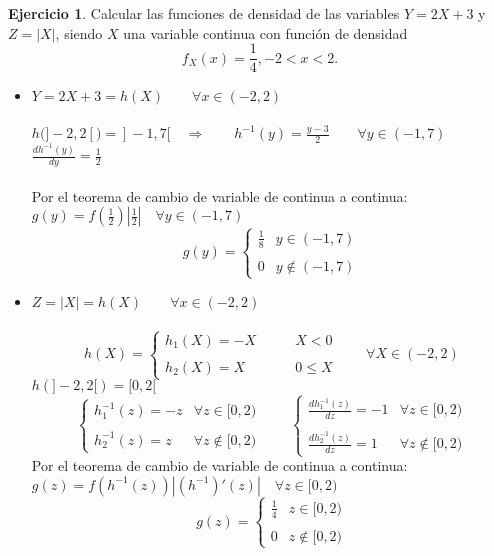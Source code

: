 \documentclass[a4paper, 12pt]{article}
\theoremstyle{definition}
\newtheorem{ej}{Ejercicio}
\begin{document}
\begin{ej}
		Calcular las funciones de densidad de las variables $Y = 2X +3$ y $Z = |X|$, siendo $X$ una
	variable continua con función de densidad
	\[f_X(x) = \frac{1}{4}, -2 < x < 2.\]
	\begin{itemize}
		\item \(Y = 2X+3 = h(X) \qquad\forall x\in (-2, 2)\) \\
		\\
		\(h(]-2,2[) = ]-1,7[\quad \Longrightarrow \qquad h^{-1}(y) = \frac{y-3}{2}\qquad\forall y\in (-1,7)\) \\
		\(\frac{dh^{-1}(y)}{dy} = \frac{1}{2}\) \\
		\\
		Por el teorema de cambio de variable de continua a continua: \\
		\(
		g(y) = f\left(\frac{1}{2}\right)\left|\frac{1}{2}\right| \quad \forall y \in (-1,7)\)
		\[
		g(y) = \left\{ \begin{array}{cc}
		\frac{1}{8}  &  y \in (-1,7)\\
		& \\
		0   & y \notin (-1,7)
		\end{array} \right.
		\]
		
		\item \(Z = |X| = h(X) \qquad\forall x\in (-2,2)\) \\
		\\
		\[h(X) = \left\{ \begin{array}{cc}
		h_1(X) = -X &\qquad X < 0 \\
		& \\
		h_2(X) = X &\qquad 0 \leq X
		\end{array} \right. \qquad \forall X\in (-2,2)\]
		\(h(]-2,2[) = [0,2[\)
		\[\left\{\begin{array}{cc}
		h_1^{-1}(z) = -z  & \forall z\in [0,2) \\
		& \\
		h_2^{-1}(z) = z  & \forall z\notin [0,2) 
		\end{array}\right. \qquad
		\left\{\begin{array}{cc}
		\frac{dh_1^{-1}(z)}{dz} = -1 &  \forall z \in [0,2)\\
		& \\
		\frac{dh_2^{-1}(z)}{dz} = 1 & \forall z \notin [0,2)
		
		\end{array} \right.\]
		Por el teorema de cambio de variable de continua a continua: \\ 
		\(g(z) = f\left(h^{-1}(z)\right)\left|\left(h^{-1}\right)'(z)\right| \quad \forall z \in [0,2)\)
		\[g(z) = \left\{\begin{array}{cc}
		\frac{1}{4} & z \in [0,2) \\
		& \\
		0 & z \notin[0,2)
		\end{array}\right.\]
	\end{itemize}
\end{ej}
\end{document}
